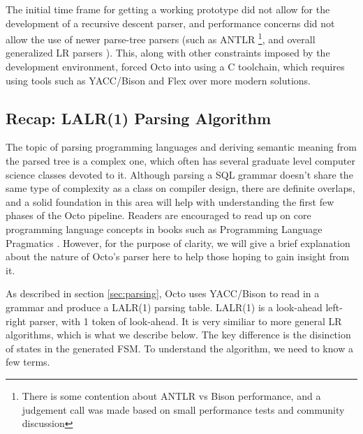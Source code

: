 \documentclass[]{article}
\begin{document}
The initial time frame for getting a working prototype did not allow for the development of a recursive descent parser, and performance concerns did not allow the use of newer parse-tree parsers (such as ANTLR \cite{parr2013definitive} \footnote{There is some contention about ANTLR vs Bison performance, and a judgement call was made based on small performance tests and community discussion}, and overall generalized LR parsers \cite{lang1974deterministic}).
This, along with other constraints imposed by the development environment, forced Octo into using a C toolchain, which requires using tools such as YACC/Bison and Flex over more modern solutions.

\subsection{Recap: LALR(1) Parsing Algorithm}

The topic of parsing programming languages and deriving semantic meaning from the parsed tree is a complex one, which often has several graduate level computer science classes devoted to it.
Although parsing a SQL grammar doesn't share the same type of complexity as a class on compiler design, there are definite overlaps, and a solid foundation in this area will help with understanding the first few phases of the Octo pipeline.
Readers are encouraged to read up on core programming language concepts in books such as Programming Language Pragmatics \cite{scott2000programming}.
However, for the purpose of clarity, we will give a brief explanation about the nature of Octo's parser here to help those hoping to gain insight from it.

As described in section \ref{sec:parsing}, Octo uses YACC/Bison to read in a grammar and produce a LALR(1) parsing table.
LALR(1) is a look-ahead left-right parser, with 1 token of look-ahead.
It is very similiar to more general LR algorithms, which is what we describe below.
The key difference is the disinction of states in the generated FSM.
To understand the algorithm, we need to know a few terms.
\end{document}
